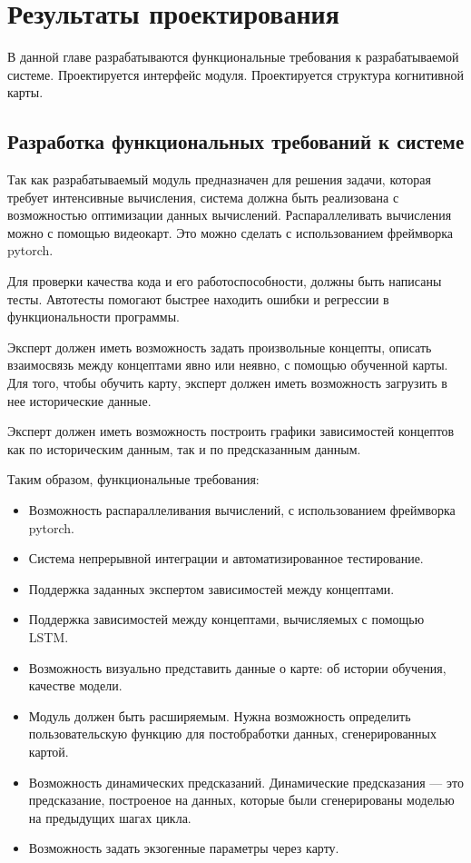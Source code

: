\chapter{Результаты проектирования}

\begin{annotation}
	В данной главе разрабатываются функциональные требования к разрабатываемой системе.
	Проектируется интерфейс модуля. Проектируется структура когнитивной карты.
\end{annotation}


\section{Разработка функциональных требований к системе}

Так как разрабатываемый модуль предназначен для решения задачи, которая
требует интенсивные вычисления, система должна быть реализована
с возможностью оптимизации данных вычислений. Распараллеливать вычисления
можно с помощью видеокарт. Это можно сделать с использованием фреймворка pytorch.

Для проверки качества кода и его работоспособности, должны быть написаны тесты.
Автотесты помогают быстрее находить ошибки и регрессии в функциональности программы.

Эксперт должен иметь возможность задать произвольные концепты, описать
взаимосвязь между концептами явно или неявно, с помощью обученной карты.
Для того, чтобы обучить карту, эксперт должен иметь возможность загрузить
в нее исторические данные.

Эксперт должен иметь возможность построить графики зависимостей концептов
как по историческим данным, так и по предсказанным данным.

Таким образом, функциональные требования:
\begin{itemize}
	\item Возможность распараллеливания вычислений, с использованием фреймворка pytorch.
	\item Система непрерывной интеграции и автоматизированное тестирование.
	\item Поддержка заданных экспертом зависимостей между концептами.
	\item Поддержка зависимостей между концептами, вычисляемых с помощью LSTM.
	\item Возможность визуально представить данные о карте: об истории обучения, качестве модели.
	\item Модуль должен быть расширяемым. Нужна возможность определить пользовательскую функцию для постобработки данных, сгенерированных картой.
	\item Возможность динамических предсказаний. Динамические предсказания --- это
	предсказание, построеное на данных, которые были сгенерированы моделью на предыдущих шагах цикла.
	\item Возможность задать экзогенные параметры через карту.
\end{itemize}

